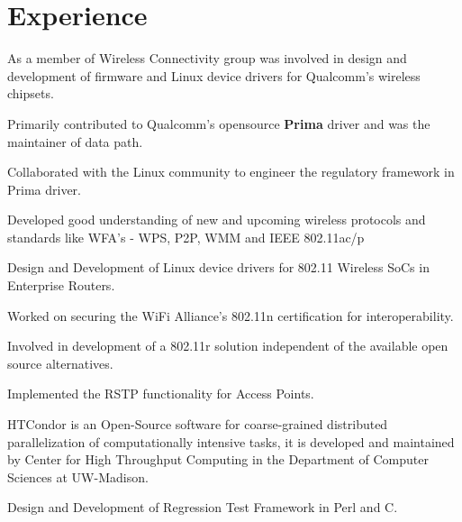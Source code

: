 \documentclass[letterpaper]{deedy-resume} %
\begin{document}
\begin{minipage}[t]{1.0\textwidth}
\section{Experience}
\begin{tightitemize}
\item As a member of Wireless Connectivity group was involved in design and development of firmware and Linux device drivers for Qualcomm's wireless chipsets.
\item Primarily contributed to Qualcomm's opensource \textbf{Prima} driver and was the maintainer of data path.
\item Collaborated with the Linux community to engineer the regulatory framework in Prima driver.
\item Developed good understanding of new and upcoming wireless protocols and standards like WFA's - WPS, P2P, WMM and IEEE 802.11ac/p
\end{tightitemize}

\sectionspace %



\begin{tightitemize}
\item Design and Development of Linux device drivers for 802.11 Wireless SoCs in Enterprise Routers.
\item Worked on securing the WiFi Alliance's 802.11n certification for interoperability.
\item Involved in development of a 802.11r solution independent of the available open source alternatives.
\item Implemented the RSTP functionality for Access Points.
\end{tightitemize}

\sectionspace %


HTCondor is an Open-Source software for coarse-grained distributed parallelization of computationally intensive tasks,
it is developed and maintained by Center for High Throughput Computing in the Department of Computer Sciences at UW-Madison.
\begin{tightitemize}
\item Design and Development of Regression Test Framework in Perl and C.
\end{tightitemize}


\end{minipage}
\end{document}
